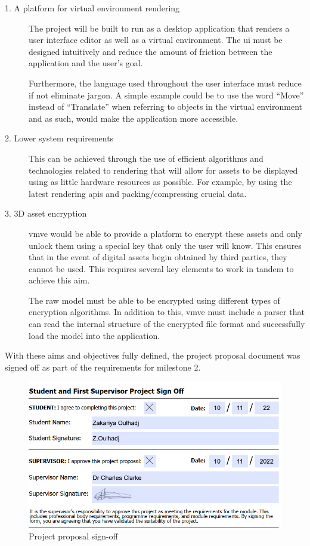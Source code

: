 \documentclass[11pt]{article}
\begin{document}
\begin{description}
  \item[1. A platform for virtual environment rendering] 
  The project will be built to run as a desktop application that renders a user
  interface editor as well as a virtual environment. The \gls*{ui} must be
  designed intuitively and reduce the amount of friction between the application
  and the user's goal.

  Furthermore, the language used throughout the user interface must reduce if
  not eliminate jargon. A simple example could be to use the word ``Move''
  instead of ``Translate'' when referring to objects in the virtual environment
  and as such, would make the application more accessible.
  \item[2. Lower system requirements]
    This can be achieved through the use of efficient algorithms and
    technologies related to rendering that will allow for assets to be displayed
    using as little hardware resources as possible. For example, by using the
    latest rendering \glspl*{api} and packing/compressing crucial data.
  \item[3. 3D asset encryption]
    \gls*{vmve} would be able to provide a platform to encrypt these assets and
    only unlock them using a special key that only the user will know. This
    ensures that in the event of digital assets begin obtained by third parties,
    they cannot be used. This requires several key elements to work in tandem to
    achieve this aim.
    
    The raw model must be able to be encrypted using different types of encryption
    algorithms. In addition to this, \gls*{vmve} must include a parser that can read
    the internal structure of the encrypted file format and successfully load the
    model into the application.
\end{description}


With these aims and objectives fully defined, the project proposal document was signed off
as part of the requirements for milestone 2. 
\begin{figure}[H]
  \centering
  \includegraphics[width=\textwidth]{images/project_signoff.png}
  \caption{Project proposal sign-off}
  \label{fig:project_signoff}
\end{figure}
\end{document}
